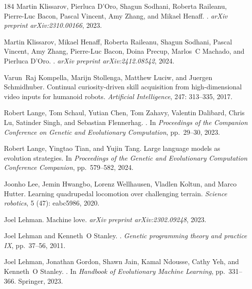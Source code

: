\begin{thebibliography}{184}
Martin Klissarov, Pierluca D'Oro, Shagun Sodhani, Roberta Raileanu, Pierre-Luc
  Bacon, Pascal Vincent, Amy Zhang, and Mikael Henaff.
.
\newblock \emph{arXiv preprint arXiv:2310.00166}, 2023.

Martin Klissarov, Mikael Henaff, Roberta Raileanu, Shagun Sodhani, Pascal
  Vincent, Amy Zhang, Pierre-Luc Bacon, Doina Precup, Marlos~C Machado, and
  Pierluca D'Oro.
.
\newblock \emph{arXiv preprint arXiv:2412.08542}, 2024.

Varun~Raj Kompella, Marijn Stollenga, Matthew Luciw, and Juergen Schmidhuber.
\newblock Continual curiosity-driven skill acquisition from high-dimensional
  video inputs for humanoid robots.
\newblock \emph{Artificial Intelligence}, 247: 313--335, 2017.

Robert Lange, Tom Schaul, Yutian Chen, Tom Zahavy, Valentin Dalibard, Chris Lu,
  Satinder Singh, and Sebastian Flennerhag.
.
\newblock In \emph{Proceedings of the Companion Conference on Genetic and
  Evolutionary Computation}, pp.\  29--30, 2023.

Robert Lange, Yingtao Tian, and Yujin Tang.
\newblock Large language models as evolution strategies.
\newblock In \emph{Proceedings of the Genetic and Evolutionary Computation
  Conference Companion}, pp.\  579--582, 2024.

Joonho Lee, Jemin Hwangbo, Lorenz Wellhausen, Vladlen Koltun, and Marco Hutter.
\newblock Learning quadrupedal locomotion over challenging terrain.
\newblock \emph{Science robotics}, 5 (47): eabc5986, 2020.

Joel Lehman.
\newblock Machine love.
\newblock \emph{arXiv preprint arXiv:2302.09248}, 2023.

Joel Lehman and Kenneth~O Stanley.
.
\newblock \emph{Genetic programming theory and practice IX}, pp.\  37--56,
  2011.

Joel Lehman, Jonathan Gordon, Shawn Jain, Kamal Ndousse, Cathy Yeh, and
  Kenneth~O Stanley.
.
\newblock In \emph{Handbook of Evolutionary Machine Learning}, pp.\  331--366.
  Springer, 2023.


\end{thebibliography}
